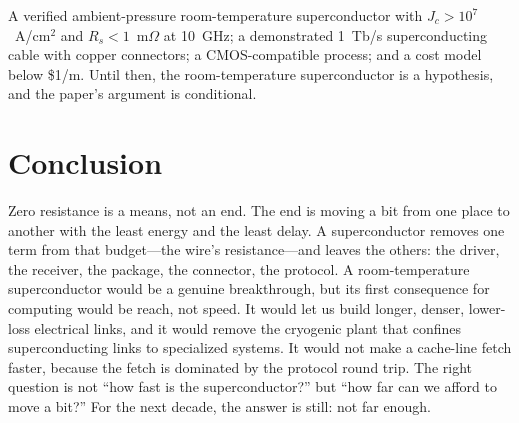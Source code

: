 \documentclass[10pt,letterpaper]{article}
\begin{document}
A verified ambient-pressure room-temperature superconductor with $J_c > 10^7$~A/cm$^2$ and $R_s < 1$~m$\Omega$ at 10~GHz; a demonstrated 1~Tb/s superconducting cable with copper connectors; a CMOS-compatible process; and a cost model below \$1/m. Until then, the room-temperature superconductor is a hypothesis, and the paper's argument is conditional.

\section{Conclusion}
\label{sec:conclusion}

Zero resistance is a means, not an end. The end is moving a bit from one place to another with the least energy and the least delay. A superconductor removes one term from that budget---the wire's resistance---and leaves the others: the driver, the receiver, the package, the connector, the protocol. A room-temperature superconductor would be a genuine breakthrough, but its first consequence for computing would be reach, not speed. It would let us build longer, denser, lower-loss electrical links, and it would remove the cryogenic plant that confines superconducting links to specialized systems. It would not make a cache-line fetch faster, because the fetch is dominated by the protocol round trip. The right question is not ``how fast is the superconductor?'' but ``how far can we afford to move a bit?'' For the next decade, the answer is still: not far enough.
\end{document}
